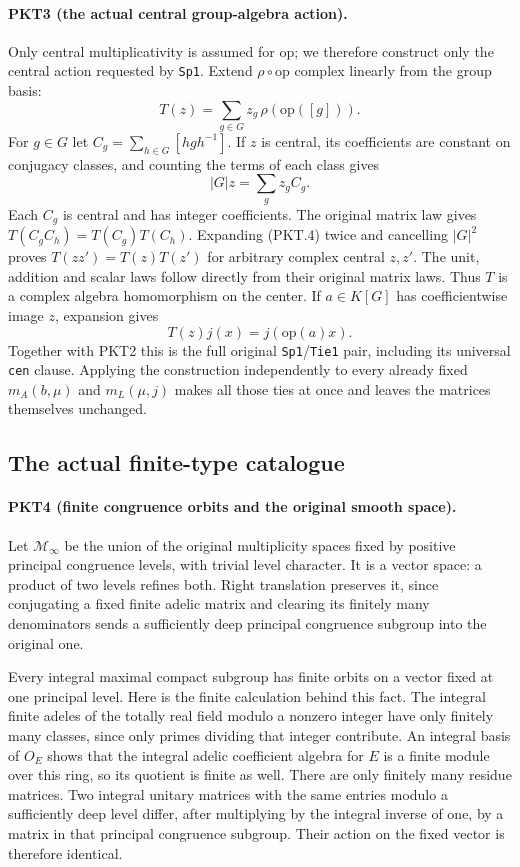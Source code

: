 \paragraph{PKT3 (the actual central group-algebra action).}\label{claim:PKT3}
Only central multiplicativity is assumed for $\mathrm{op}$; we therefore
construct only the central action requested by \texttt{Sp1}.
Extend $\rho\circ\mathrm{op}$ complex linearly from the group basis:
\[
 T(z)=\sum_{g\in G}z_g\,\rho(\mathrm{op}([g])).
\]
For $g\in G$ let $C_g=\sum_{h\in G}[hgh^{-1}]$.  If $z$ is central,
its coefficients are constant on conjugacy classes, and counting the terms
of each class gives
\[
 |G|z=\sum_g z_g C_g.\tag{PKT.4}
\]
Each $C_g$ is central and has integer coefficients.  The original matrix
law gives $T(C_gC_h)=T(C_g)T(C_h)$.  Expanding (PKT.4) twice and cancelling
$|G|^2$ proves $T(zz')=T(z)T(z')$ for arbitrary complex central $z,z'$.
The unit, addition and scalar laws follow directly from their original
matrix laws.  Thus $T$ is a complex algebra homomorphism on the center.
If $a\in K[G]$ has coefficientwise image $z$, expansion gives
\[
 T(z)j(x)=j(\mathrm{op}(a)x).
\]
Together with PKT2 this is the full original \texttt{Sp1}/\texttt{Tie1}
pair, including its universal \texttt{cen} clause.  Applying the construction
independently to every already fixed $m_A(b,\mu)$ and $m_L(\mu,j)$ makes
all those ties at once and leaves the matrices themselves unchanged.

\subsection{The actual finite-type catalogue}

\paragraph{PKT4 (finite congruence orbits and the original smooth space).}\label{claim:PKT4}
Let $\mathcal M_\infty$ be the union of the original multiplicity spaces
fixed by positive principal congruence levels, with trivial level character.
It is a vector space: a product of two levels refines both.  Right translation
preserves it, since conjugating a fixed finite adelic matrix and clearing its
finitely many denominators sends a sufficiently deep principal congruence
subgroup into the original one.

Every integral maximal compact subgroup has finite orbits on a vector fixed
at one principal level.  Here is the finite calculation behind this fact.
The integral finite adeles of the totally real field modulo a nonzero
integer have only finitely many classes, since only primes dividing that
integer contribute.  An integral basis of $O_E$ shows that the integral
adelic coefficient algebra for $E$ is a finite module over this ring, so its
quotient is finite as well.  There are only finitely many residue matrices.
Two integral unitary matrices with the same entries modulo a sufficiently
deep level differ, after multiplying by the integral inverse of one, by a
matrix in that principal congruence subgroup.  Their action on the fixed
vector is therefore identical.

